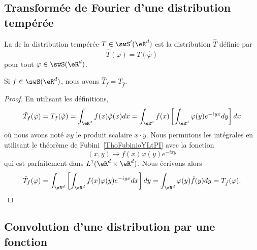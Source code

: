 \subsection{Transformée de Fourier d'une distribution tempérée}

\begin{definition}
	La  de la distribution tempérée \( T\in\swS'(\eR^d)\) est la distribution \( \hat T\) définie par
	\begin{equation}
		\hat T(\varphi)=T(\hat \varphi)
	\end{equation}
	pour tout \( \varphi\in\swS(\eR^d)\).
\end{definition}

\begin{lemma}
	Si \( f\in \swS(\eR^d)\), nous avons \( \hat T_f=T_{\hat f}\).
\end{lemma}

\begin{proof}
	En utilisant les définitions,
	\begin{equation}
		\hat T_f(\varphi)=T_f(\hat \varphi)=\int_{\eR^d}f(x)\hat \varphi(x)dx=\int_{\eR^d}f(x)\left[ \int_{\eR^d}\varphi(y) e^{-iyx}dy \right]dx
	\end{equation}
	où nous avons noté \( xy\) le produit scalaire \( x\cdot y\). Nous permutons les intégrales en utilisant le théorème de Fubini~\ref{ThoFubinioYLtPI} avec la fonction
	\begin{equation}
		(x,y)\mapsto f(x)\varphi(y) e^{-ixy}
	\end{equation}
	qui est parfaitement dans \( L^1(\eR^d\times \eR^d)\). Nous écrivons alors
	\begin{equation}
		\hat T_f(\varphi)=\int_{\eR^d}\left[ \int_{\eR^d}f(x)\varphi(y) e^{-iyx}dx \right]dy=\int_{\eR^d}\varphi(y)\hat f(y)dy=T_{\hat f}(\varphi).
	\end{equation}
\end{proof}

\subsection{Convolution d'une distribution par une fonction}

